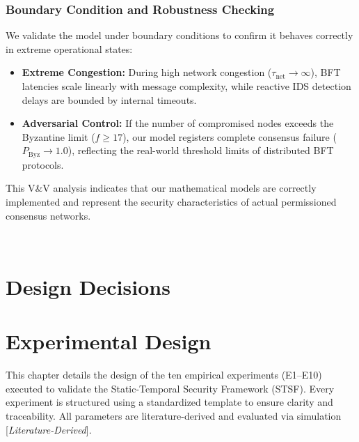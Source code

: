 \documentclass[12pt, oneside, a4paper]{report}
\theoremstyle{definition}
\theoremstyle{remark}
\newcommand{\litderived}{[\textit{Literature-Derived}]}
\begin{document}
\subsection{Boundary Condition and Robustness Checking}
We validate the model under boundary conditions to confirm it behaves correctly in extreme operational states:
\begin{itemize}
  \item \textbf{Extreme Congestion:} During high network congestion ($\tau_{\mathrm{net}} \to \infty$), BFT latencies scale linearly with message complexity, while reactive IDS detection delays are bounded by internal timeouts.
  \item \textbf{Adversarial Control:} If the number of compromised nodes exceeds the Byzantine limit ($f \ge 17$), our model registers complete consensus failure ($P_{\mathrm{Byz}} \to 1.0$), reflecting the real-world threshold limits of distributed BFT protocols.
\end{itemize}
This V\&V analysis indicates that our mathematical models are correctly implemented and represent the security characteristics of actual permissioned consensus networks.



\cleardoublepage


﻿%
\chapter{Design Decisions}
\label{ch:design_decisions}

\chapter{Experimental Design}
\label{ch:experimental_design}

This chapter details the design of the ten empirical experiments (E1--E10) executed to validate the Static-Temporal Security Framework (STSF). Every experiment is structured using a standardized template to ensure clarity and traceability. All parameters are literature-derived and evaluated via simulation \litderived.
\end{document}
